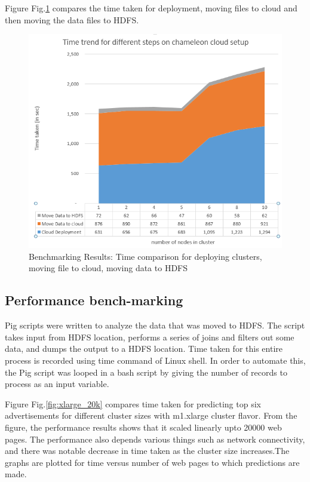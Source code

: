 \documentclass[9pt,twocolumn,twoside]{../../styles/osajnl}
\begin{document}
Figure Fig.\ref{fig:deployment_timetrend} compares the time taken for deployment, moving files to cloud and then moving the data files to HDFS.

\begin{figure}[hptb]
\centering
\includegraphics[width=\linewidth]{images/deployment_timetrend.PNG}
\caption{ Benchmarking Results: Time comparison for deploying clusters, moving file to cloud, moving data to HDFS}
\label{fig:deployment_timetrend}
\end{figure}

\subsection{Performance bench-marking}
Pig scripts were written to analyze the data that was moved to HDFS. The script takes input from HDFS location, performs a series of joins and filters out some data, and dumps the output to a HDFS location. Time taken for this entire process is recorded using time command of Linux shell. In order to automate this, the Pig script was looped in a bash script by giving the number of records to process as an input variable. 

Figure Fig.\ref{fig:xlarge_20k} compares time taken for predicting top six advertisements for different cluster sizes with m1.xlarge cluster flavor. From the figure, the performance results shows that it scaled linearly upto 20000 web pages. The performance also depends various things such as network connectivity, and there was notable decrease in time taken as the cluster size increases.The graphs are plotted for time versus number of web pages to which predictions are made.
\end{document}
